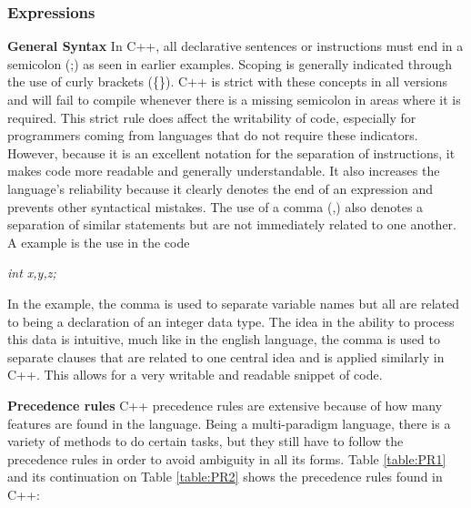 \documentclass[12pt]{article}
\begin{document}
\subsubsection{Expressions}
\textbf{General Syntax} In C++, all declarative sentences or instructions must end in a semicolon (;) as seen in earlier examples. Scoping is generally indicated through the use of curly brackets (\{\}). C++ is strict with these concepts in all versions and will fail to compile whenever there is a missing semicolon in areas where it is required. This strict rule does affect the writability of code, especially for programmers coming from languages that do not require these indicators. However, because it is an excellent notation for the separation of instructions, it makes code more readable and generally understandable. It also increases the language's reliability because it clearly denotes the end of an expression and prevents other syntactical mistakes. The use of a comma (,) also denotes a separation of similar statements but are not immediately related to one another. A example is the use in the code
\begin{center}
  \textit{int x,y,z;}
\end{center} 
In the example, the comma is used to separate variable names but all are related to being a declaration of an integer data type. The idea in the ability to process this data is intuitive, much like in the english language, the comma is used to separate clauses that are related to one central idea and is applied similarly in C++. This allows for a very writable and readable snippet of code.

\textbf{Precedence rules} C++ precedence rules are extensive because of how many features are found in the language. Being a multi-paradigm language, there is a variety of methods to do certain tasks, but they still have to follow the precedence rules in order to avoid ambiguity in all its forms. Table \ref{table:PR1} and its continuation on Table \ref{table:PR2} shows the precedence rules found in C++:
\end{document}
